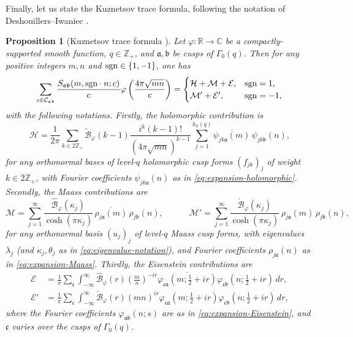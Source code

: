 \documentclass[reqno,11pt]{amsart}
\newtheorem{knownproposition}[knowntheorem]{Proposition}
\theoremstyle{remark}
\numberwithin{equation}{section}
\newcommand{\Z}{\mathbb{Z}}
\newcommand{\R}{\mathbb{R}}
\newcommand{\C}{\mathbb{C}}
\newcommand{\mB}{\mathcal{B}}
\newcommand{\mC}{\mathcal{C}}
\newcommand{\mE}{\mathcal{E}}
\newcommand{\mH}{\mathcal{H}}
\newcommand{\mM}{\mathcal{M}}
\newcommand{\ma}{\mathfrak{a}}
\newcommand{\mb}{\mathfrak{b}}
\newcommand{\mc}{\mathfrak{c}}
\newcommand{\sgn}{\textnormal{sgn}}
\renewcommand{\bar}{\overline}
\renewcommand{\hat}{\widehat}
\renewcommand{\tilde}{\widetilde}
\begin{document}
Finally, let us state the Kuznetsov trace formula, following the notation of Deshouillers--Iwaniec \cite{deshouillers1982kloosterman}.

\begin{knownproposition}[Kuznetsov trace formula \cite{deshouillers1982kloosterman,kuznetsov1980petersson}] \label{prop:kuznetsov}
Let $\varphi : \R \to \C$ be a compactly-supported smooth function, $q \in \Z_+$, and $\ma, \mb$ be cusps of $\Gamma_0(q)$. Then for any positive integers $m, n$ and $\sgn \in \{1, -1\}$, one has
\begin{equation} \label{eq:kuznetsov}
    \sum_{c \in \mC_{\ma\mb}} \frac{S_{\ma\mb}(m, \sgn\cdot n; c)}{c} \varphi \left(\frac{4 \pi \sqrt{mn}}{c}\right)
    =
    \begin{cases}
        \mH + \mM + \mE, & \sgn = 1, \\
        \mM' + \mE', & \sgn = -1,
    \end{cases}
\end{equation}
with the following notations. Firstly, the \emph{holomorphic} contribution is
\begin{equation} \label{eq:holomorphic-contribution}
    \mH = \frac{1}{2\pi} \sum_{k \in 2\Z_+} \tilde{\mB}_\varphi(k-1) \frac{i^k (k-1)!}{(4\pi \sqrt{mn})^{k-1}} \sum_{j = 1}^{h_k(q)}  \bar{\psi_{jk\ma}(m)}\, \psi_{jk\mb}(n),
\end{equation}
for any orthonormal bases of level-$q$ holomorphic cusp forms $(f_{jk})_j$ of weight $k \in 2\Z_+$, with Fourier coefficients $\psi_{jk\ma}(n)$ as in \cref{eq:expansion-holomorphic}. Secondly, the \emph{Maass} contributions are
\begin{equation} \label{eq:Maass-contribution}
    \mM = \sum_{j = 1}^\infty \frac{\hat{\mB}_\varphi(\kappa_j)}{\cosh(\pi \kappa_j)}\, \bar{\rho_{j\ma}(m)}\, \rho_{j\mb}(n),
    \qquad\quad
    \mM' = \sum_{j = 1}^\infty \frac{\check{\mB}_\varphi(\kappa_j)}{\cosh(\pi \kappa_j)}\, \rho_{j\ma}(m)\, \rho_{j\mb}(n),
\end{equation}
for any orthonormal basis $(u_j)_j$ of level-$q$ Maass cusp forms, with eigenvalues $\lambda_j$ (and $\kappa_j, \theta_j$ as in \cref{eq:eigenvalue-notation}), and Fourier coefficients $\rho_{j\ma}(n)$ as in \cref{eq:expansion-Maass}. Thirdly, the \emph{Eisenstein} contributions are
\begin{equation} \label{eq:Eisenstein-contribution}
\begin{aligned}
    \mE &= \frac{1}{\pi} \sum_{\mc} \int_{-\infty}^\infty \hat{\mB}_\varphi(r)\left(\frac{m}{n}\right)^{-ir} \bar{\varphi_{\mc\ma}\left(m; \frac{1}{2} + ir\right)} \varphi_{\mc\mb}\left(n; \frac{1}{2} + ir\right)\, dr,
    \\
    \mE' &= \frac{1}{\pi} \sum_{\mc} \int_{-\infty}^\infty \check{\mB}_\varphi(r)\left(mn\right)^{ir} \varphi_{\mc\ma}\left(m; \frac{1}{2} + ir\right) \varphi_{\mc\mb}\left(n; \frac{1}{2} + ir\right)\, dr,
\end{aligned}
\end{equation}
where the Fourier coefficients $\varphi_{\ma\mb}(n; s)$ are as in \cref{eq:expansion-Eisenstein}, and $\mc$ varies over the cusps of $\Gamma_0(q)$.
\end{knownproposition}
\end{document}
